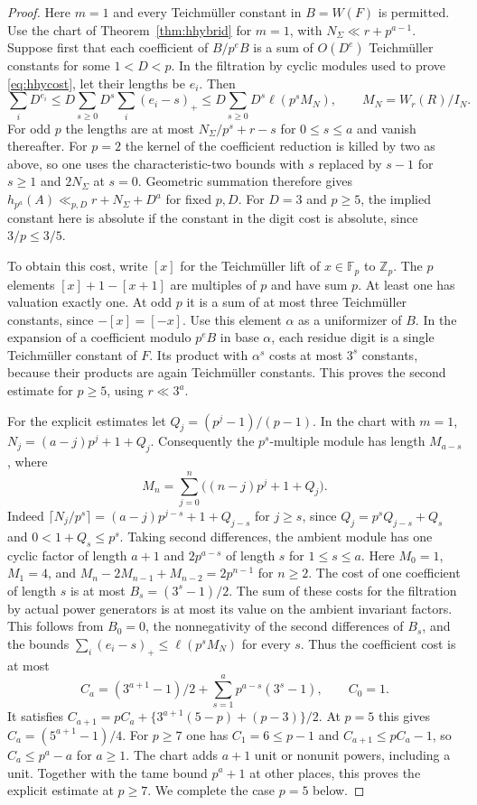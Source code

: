 \documentclass[11pt,letterpaper]{article}
\theoremstyle{definition}
\numberwithin{equation}{section}
\begin{document}
\begin{proof}
Here $m=1$ and every Teichm\"uller constant in $B=W(F)$ is permitted.
Use the chart of Theorem~\ref{thm:hhybrid} for $m=1$, with
$N_\Sigma\ll r+p^{a-1}$. Suppose first that each coefficient
of $B/p^eB$ is a sum of $O(D^e)$ Teichm\"uller constants for some
$1<D<p$. In the filtration by cyclic modules used to prove
\eqref{eq:hhycost}, let their lengths be $e_i$. Then
\[
 \sum_i D^{e_i}
   \le D\sum_{s\ge0}D^s\sum_i(e_i-s)_+
   \le D\sum_{s\ge0}D^s\ell(p^sM_N),\qquad M_N=W_r(R)/I_N.
\]
For odd $p$ the lengths are at most $N_\Sigma/p^s+r-s$ for
$0\le s\le a$ and vanish thereafter. For $p=2$ the kernel of
the coefficient reduction is killed by two as above, so one uses
the characteristic-two bounds with $s$ replaced by $s-1$ for $s\ge1$
and $2N_\Sigma$ at $s=0$. Geometric summation therefore gives
$h_{p^a}(A)\ll_{p,D}r+N_\Sigma+D^a$ for fixed $p,D$.
For $D=3$ and $p\ge5$, the implied constant here is absolute
if the constant in the digit cost is absolute, since $3/p\le3/5$.

To obtain this cost, write $[x]$ for the Teichm\"uller lift of
$x\in\mathbb F_p$ to $\mathbb Z_p$. The $p$ elements
$[x]+1-[x+1]$ are multiples of $p$ and have sum $p$. At least one
has valuation exactly one. At odd $p$ it is a sum of at most three
Teichm\"uller constants, since $-[x]=[-x]$. Use this element $\alpha$
as a uniformizer of $B$. In the expansion of a coefficient modulo
$p^eB$ in base $\alpha$, each residue digit is a single Teichm\"uller
constant of $F$. Its product with $\alpha^s$ costs at most $3^s$
constants, because their products are again Teichm\"uller constants.
This proves the second estimate for $p\ge5$, using $r\ll3^a$.

For the explicit estimates let $Q_j=(p^j-1)/(p-1)$.
In the chart with $m=1$, $N_j=(a-j)p^j+1+Q_j$. Consequently
the $p^s$-multiple module has length $M_{a-s}$, where
\[
       M_n=\sum_{j=0}^n\bigl((n-j)p^j+1+Q_j\bigr).
\]
Indeed $\lceil N_j/p^s\rceil=(a-j)p^{j-s}+1+Q_{j-s}$
for $j\ge s$, since $Q_j=p^s Q_{j-s}+Q_s$ and $0<1+Q_s\le p^s$.
Taking second differences, the ambient module has one cyclic factor
of length $a+1$ and $2p^{a-s}$ of length $s$ for $1\le s\le a$.
Here $M_0=1$, $M_1=4$, and
$M_n-2M_{n-1}+M_{n-2}=2p^{n-1}$ for $n\ge2$.
The cost of one coefficient of length $s$ is at most
$B_s=(3^s-1)/2$. The sum of these costs for the filtration by
actual power generators is at most its value on the ambient
invariant factors. This follows from $B_0=0$, the nonnegativity
of the second differences of $B_s$, and the bounds $\sum_i(e_i-s)_+\le\ell(p^sM_N)$ for every $s$.
Thus the coefficient cost is at most
\[
 C_a=(3^{a+1}-1)/2+\sum_{s=1}^a p^{a-s}(3^s-1),
 \qquad C_0=1 .
\]
It satisfies
$C_{a+1}=pC_a+\{3^{a+1}(5-p)+(p-3)\}/2$.
At $p=5$ this gives $C_a=(5^{a+1}-1)/4$.
For $p\ge7$ one has $C_1=6\le p-1$ and
$C_{a+1}\le p C_a-1$, so $C_a\le p^a-a$ for $a\ge1$.
The chart adds $a+1$ unit or nonunit powers, including a unit.
Together with the tame bound $p^a+1$ at other places, this proves
the explicit estimate at $p\ge7$. We complete the case $p=5$ below.


\end{proof}
\end{document}
